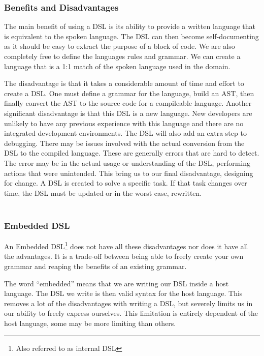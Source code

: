 \subsubsection{Benefits and Disadvantages}
The main benefit of using a DSL is its ability to provide a written language that is equivalent to the spoken language. The DSL can then become self-documenting as it should be easy to extract the purpose of a block of code. We are also completely free to define the languages rules and grammar. We can create a language that is a 1:1 match of the spoken language used in the domain.

The disadvantage is that it takes a considerable amount of time and effort to create a DSL. One must define a grammar for the language, build an AST, then finally convert the AST to the source code for a compileable language. Another significant disadvantage is that this DSL is a new language. New developers are unlikely to have any previous experience with this language and there are no integrated development environments. The DSL will also add an extra step to debugging. There may be issues involved with the actual conversion from the DSL to the compiled language. These are generally errors that are hard to detect. The error may be in the actual usage or understanding of the DSL, performing actions that were unintended. This bring us to our final disadvantage, designing for change. A DSL is created to solve a specific task. If that task changes over time, the DSL must be updated or in the worst case, rewritten. 
\\\\
\subsubsection{Embedded DSL}
An Embedded DSL\footnote{Also referred to as internal DSL} does not have all these disadvantages nor does it have all the advantages. It is a trade-off between being able to freely create your own grammar and reaping the benefits of an existing grammar.

The word ``embedded'' means that we are writing our DSL inside a host language. The DSL we write is then valid syntax for the host language. This removes a lot of the disadvantages with writing a DSL, but severely limits us in our ability to freely express ourselves. This limitation is entirely dependent of the host language, some may be more limiting than others.


